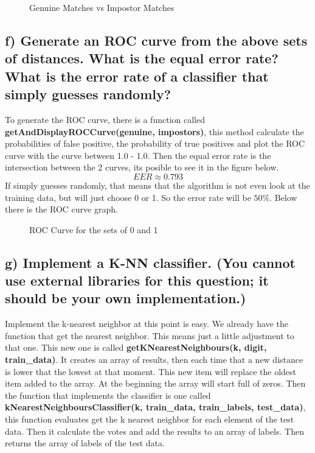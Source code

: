 \documentclass[11pt,letterpaper]{article}
\begin{document}
\begin{figure}[ht!]
\centering
{}
\caption{Genuine Matches vs Impostor Matches}\label{Genuine vs Impostor}
\end{figure}

\newpage
\subsection{f) Generate an ROC curve from the above sets of distances. What is the equal error rate? What is the error rate of a classifier that simply guesses randomly?}
To generate the ROC curve, there is a function called \textbf{getAndDisplayROCCurve(genuine, impostors)}, this method calculate the probabilities of false positive, the probability of true positives and plot the ROC curve with the curve between 1.0 - 1.0. Then the equal error rate is the intersection between the 2 curves, its posible to see it in the figure below.
$$EER \approx 0.793$$
If simply guesses randomly, that means that the algorithm is not even look at the training data, but will just choose 0 or 1. So the error rate will be $50\%$. Below there is the ROC curve graph.

\begin{figure}[ht!]
\centering
{}
\caption{ROC Curve for the sets of 0 and 1}\label{ROC Curve}
\end{figure}

\subsection{g) Implement a K-NN classifier. (You cannot use external libraries for this question; it should be your own implementation.)}
Implement the k-nearest neighbor at this point is easy. We already have the function that get the nearest neighbor. This means just a little adjustment to that one. This new one is called \textbf{getKNearestNeighbours(k, digit, train\_data)}. It creates an array of results, then each time that a new distance is lower that the lowest at that moment. This new item will replace the oldest item added to the array. At the beginning the array will start full of zeros. Then the function that implements the classifier is one called \textbf{kNearestNeighboursClassifier(k, train\_data, train\_labels, test\_data)}, this function  evaluates get the k nearest neighbor for each element of the test data. Then it calculate the votes and add the results to an array of labels. Then returns the array of labels of the test data.
\end{document}
